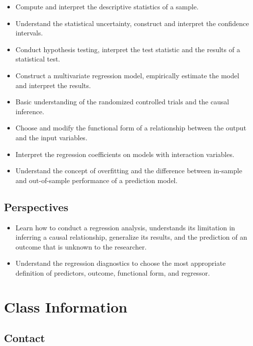 \documentclass[
]{book}
\providecommand{\tightlist}{%
  \setlength{\itemsep}{0pt}\setlength{\parskip}{0pt}}
\begin{document}
\begin{itemize}
\tightlist
\item
  Compute and interpret the descriptive statistics of a sample.
\item
  Understand the statistical uncertainty, construct and interpret the confidence intervals.
\item
  Conduct hypothesis testing, interpret the test statistic and the results of a statistical test.
\item
  Construct a multivariate regression model, empirically estimate the model and interpret the results.
\item
  Basic understanding of the randomized controlled trials and the causal inference.
\item
  Choose and modify the functional form of a relationship between the output and the input variables.
\item
  Interpret the regression coefficients on models with interaction variables.
\item
  Understand the concept of overfitting and the difference between in-sample and out-of-sample performance of a prediction model.
\end{itemize}

\hypertarget{perspectives}{%
\subsection*{Perspectives}\label{perspectives}}

\begin{itemize}
\item
  Learn how to conduct a regression analysis, understands its limitation in inferring a causal relationship, generalize its results, and the prediction of an outcome that is unknown to the researcher.
\item
  Understand the regression diagnostics to choose the most appropriate definition of predictors, outcome, functional form, and regressor.
\end{itemize}

\hypertarget{class-information}{%
\section*{Class Information}\label{class-information}}

\hypertarget{contact-information}{%
\subsection*{Contact}\label{contact-information}}
\end{document}
